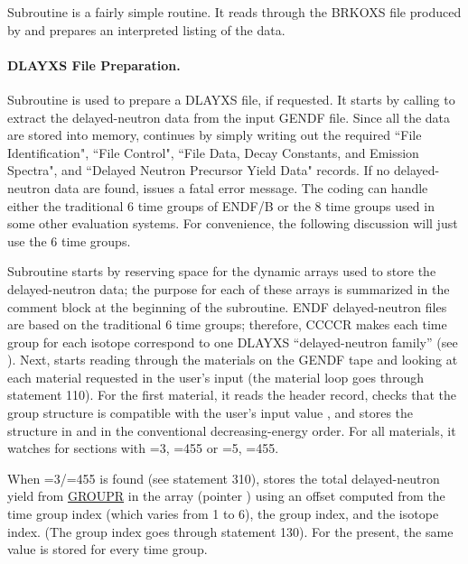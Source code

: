 Subroutine  is a
fairly simple routine.  It reads through the BRKOXS file produced
by  and prepares an interpreted listing of the data.

\paragraph{DLAYXS File Preparation.}
Subroutine  is used
to prepare a DLAYXS file, if requested.  It starts by calling
 to extract the
delayed-neutron data from the input GENDF file.  Since all the
data are stored into memory, 
continues by simply writing out the required ``File Identification",
``File Control", ``File Data, Decay Constants, and Emission Spectra",
and ``Delayed Neutron Precursor Yield Data" records.  If no
delayed-neutron data are found,  issues a fatal
error message.  The coding can handle either the traditional
6 time groups of ENDF/B or the 8 time groups used in some other
evaluation systems.  For convenience, the following discussion will
just use the 6 time groups.

Subroutine  starts by
reserving space for the dynamic arrays used to store the
delayed-neutron data; the purpose for each of these arrays is
summarized in the comment block at the beginning of the subroutine.
ENDF delayed-neutron files are based on the traditional 6 time groups;
therefore, CCCCR makes each time group for each isotope correspond
to one DLAYXS ``delayed-neutron family'' (see ).
Next,  starts reading through the materials on the GENDF
tape and looking at each material requested in the user's input
(the material loop goes through statement 110).  For the first
material, it reads the header record, checks that the group
structure is compatible with the user's input value ,
and stores the structure in  and  in the
conventional decreasing-energy order.  For all materials,
it watches for sections with =3, =455 or
=5, =455.

When =3/=455 is found (see statement 310),
 stores the total delayed-neutron
yield from \hyperlink{sGROUPRhy}{GROUPR} in the
 array (pointer )
using an offset computed from the time group index (which varies
from 1 to 6), the group index, and the isotope index.  (The
group index goes through statement 130).  For the present,
the same value is stored for every time group.

